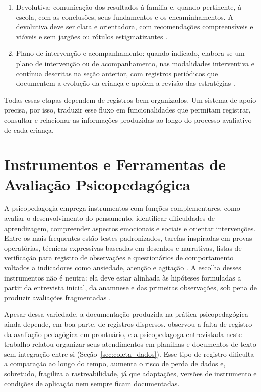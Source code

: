 \begin{enumerate}
    \item Devolutiva: comunicação dos resultados à família e, quando pertinente, à escola, com as conclusões, seus fundamentos e os encaminhamentos. A devolutiva deve ser clara e orientadora, com recomendações compreensíveis e viáveis e sem jargões ou rótulos estigmatizantes \cite{Franca_Oliveira_Oliveira_Ribeiro_Dias_Victoria_2024}.
    \item Plano de intervenção e acompanhamento: quando indicado, elabora-se um plano de intervenção ou de acompanhamento, nas modalidades interventiva e contínua descritas na seção anterior, com registros periódicos que documentem a evolução da criança e apoiem a revisão das estratégias \cite{Costa_2024, tavares2022_instrumentos_psicopedagogicos}.
\end{enumerate}

Todas essas etapas dependem de registros bem organizados. Um sistema de apoio precisa, por isso, traduzir esse fluxo em funcionalidades que permitam registrar, consultar e relacionar as informações produzidas ao longo do processo avaliativo de cada criança.

\section{Instrumentos e Ferramentas de Avaliação Psicopedagógica}\label{sec:fund_instrumentos}

A psicopedagogia emprega instrumentos com funções complementares, como avaliar o desenvolvimento do pensamento, identificar dificuldades de aprendizagem, compreender aspectos emocionais e sociais e orientar intervenções. Entre os mais frequentes estão testes padronizados, tarefas inspiradas em provas operatórias, técnicas expressivas baseadas em desenhos e narrativas, listas de verificação para registro de observações e questionários de comportamento voltados a indicadores como ansiedade, atenção e agitação \cite{Arimura_Scaglioni_Franco_de_Lima_2025}. A escolha desses instrumentos não é neutra: ela deve estar alinhada às hipóteses formuladas a partir da entrevista inicial, da anamnese e das primeiras observações, sob pena de produzir avaliações fragmentadas \cite{Arimura_Scaglioni_Franco_de_Lima_2025}.

Apesar dessa variedade, a documentação produzida na prática psicopedagógica ainda depende, em boa parte, de registros dispersos.  observou a falta de registro da avaliação pedagógica em prontuário, e a psicopedagoga entrevistada neste trabalho relatou organizar seus atendimentos em planilhas e documentos de texto sem integração entre si (Seção~\ref{sec:coleta_dados}). Esse tipo de registro dificulta a comparação ao longo do tempo, aumenta o risco de perda de dados e, sobretudo, fragiliza a rastreabilidade, já que adaptações, versões de instrumento e condições de aplicação nem sempre ficam documentadas.

